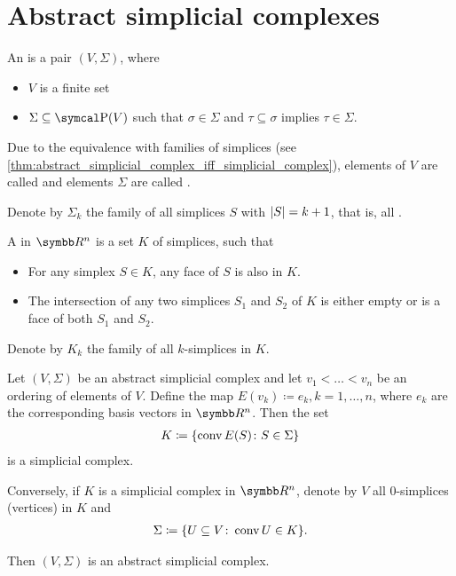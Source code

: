 \section{Abstract simplicial complexes}\label{sec:abstract_simplicial_complexes}

\begin{definition}\label{def:abstract_simplicial_complex}\cite[definition 2.1]{Carlsson2009}
  An  is a pair $(V, \Sigma)$, where
  \begin{itemize}
    \item $V$ is a finite set
    \item $\Sigma \subseteq \Power(V)$ such that $\sigma \in \Sigma$ and $\tau \subseteq \sigma$ implies $\tau \in \Sigma$.
  \end{itemize}

  Due to the equivalence with families of simplices (see \cref{thm:abstract_simplicial_complex_iff_simplicial_complex}), elements of $V$ are called  and elements $\Sigma$ are called .

  Denote by $\Sigma_k$ the family of all simplices $S$ with $\left\vert S \right\vert = k + 1$, that is, all .
\end{definition}

\begin{definition}\label{def:simplicial_complex}
  A  in $\BB{R}^n$ is a set $K$ of simplices, such that
  \begin{itemize}
    \item For any simplex $S \in K$, any face of $S$ is also in $K$.
    \item The intersection of any two simplices $S_1$ and $S_2$ of $K$ is either empty or is a face of both $S_1$ and $S_2$.
  \end{itemize}

  Denote by $K_k$ the family of all $k$-simplices in $K$.
\end{definition}

\begin{proposition}\label{thm:abstract_simplicial_complex_iff_simplicial_complex}
  Let $(V, \Sigma)$ be an abstract simplicial complex and let $v_1 < \ldots < v_n$ be an ordering of elements of $V$. Define the map $E(v_k) \coloneqq e_k, k = 1, \ldots, n$, where $e_k$ are the corresponding basis vectors in $\BB{R^n}$. Then the set
  \begin{align*}
    K \coloneqq \{ \operatorname{conv} E(S) \colon S \in \Sigma \}
  \end{align*}
  is a simplicial complex.

  Conversely, if $K$ is a simplicial complex in $\BB{R^n}$, denote by $V$ all $0$-simplices (vertices) in $K$ and
  \begin{align*}
    \Sigma \coloneqq \{ U \subseteq V \colon \operatorname{conv} U \in K \}.
  \end{align*}

  Then $(V, \Sigma)$ is an abstract simplicial complex.
\end{proposition}

